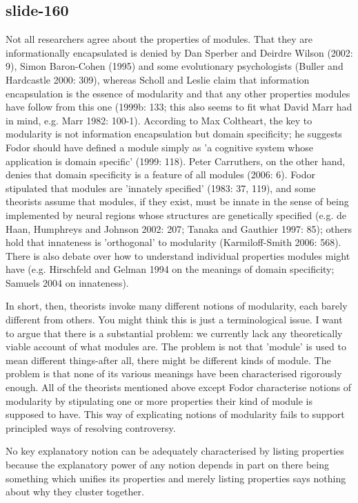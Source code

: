 \documentclass[12pt,\papersize]{extarticle}
\begin{document}
\subsection{slide-160}
Not all researchers agree about the properties of modules.  That they are
informationally encapsulated is denied by Dan Sperber and Deirdre Wilson (2002: 9),
Simon Baron-Cohen (1995) and some evolutionary psychologists (Buller and Hardcastle 2000: 309),
whereas Scholl and Leslie claim that information encapsulation is the essence of modularity
and that any other properties modules have follow from this one (1999b: 133; this also seems
to fit what David Marr had in mind, e.g. Marr 1982: 100-1).  According to Max Coltheart,
the key to modularity is not information encapsulation but domain specificity; he suggests
Fodor should have defined a module simply as 'a cognitive system whose application is domain
specific' (1999: 118).  Peter Carruthers, on the other hand, denies that domain specificity
is a feature of all modules (2006: 6).  Fodor stipulated that modules are
'innately specified' (1983: 37, 119), and some theorists assume that modules,
if they exist, must be innate in the sense of being implemented by neural regions
whose structures are genetically specified (e.g. de Haan, Humphreys and Johnson 2002: 207;
Tanaka and Gauthier 1997: 85); others hold that innateness is 'orthogonal' to modularity
(Karmiloff-Smith 2006: 568).  There is also debate over how to understand individual
properties modules might have (e.g. Hirschfeld and Gelman 1994 on the meanings of domain
specificity; Samuels 2004 on innateness).

In short, then, theorists invoke many different notions of modularity, each barely different
from others.  You might think this is just a terminological issue.  I want to argue that
there is a substantial problem: we currently lack any theoretically viable account of what
modules are.  The problem is not that 'module' is used to mean different things-after all,
there might be different kinds of module.  The problem is that none of its various meanings
have been characterised rigorously enough.  All of the theorists mentioned above except Fodor
characterise notions of modularity by stipulating one or more properties their kind of module
is supposed to have.  This way of explicating notions of modularity fails to support principled
ways of resolving controversy.

No key explanatory notion can be adequately characterised by listing properties because the
explanatory power of any notion depends in part on there being something which unifies its
properties and merely listing properties says nothing about why they cluster together.
\end{document}
